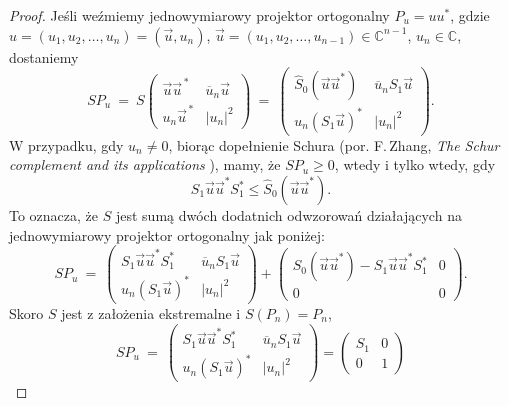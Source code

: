 \begin{proof}
Jeśli weźmiemy jednowymiarowy projektor ortogonalny
$P_{u} = u u^{*}$, gdzie
$u = (u_{1}, u_{2}, \ldots, u_{n}) = (\vec{u}, u_{n})$,
$\vec{u} = (u_{1}, u_{2}, \ldots, u_{n-1}) \in \mathbb{C}^{n-1}$,
$u_{n} \in \mathbb{C}$,
dostaniemy
\begin{equation}
 SP_{u} \:=\:  S \begin{pmatrix}
    \vec{u} \vec{u}^{\,*} & \overline{u}_{n} \vec{u} \\
    u_{n} \vec{u}^{\,*}   & |u_{n}|^{2}
 \end{pmatrix} \: = \:
 \begin{pmatrix}
    \hat{S}_{0}(\vec{u} \vec{u}^{*}) &
         \overline{u}_{n} S_{1} \vec{u} \\
    u_{n} ( S_{1} \vec{u} )^{*} &
        |u_{n}|^{2}
 \end{pmatrix}.
\end{equation}
W przypadku, gdy $u_{n} \neq 0$,
biorąc dopełnienie Schura
(por. F.\,Zhang, \emph{The Schur complement and its applications} \cite{Zhang2006}),
mamy, że $SP_{u} \geq 0$, wtedy i tylko wtedy, gdy
\begin{equation}
\label{ieq:SchurForS}
  S_{1} \vec{u} \vec{u}^{*} S_{1}^{*} \leq \hat{S}_{0}(\vec{u}\vec{u}^{*}).
\end{equation}
To oznacza, że $S$ jest sumą dwóch dodatnich odwzorowań działających na
jednowymiarowy projektor ortogonalny jak poniżej:
\begin{equation}
 SP_{u} \:=\:
 \begin{pmatrix}
      S_{1} \vec{u} \vec{u}^{*} S_{1}^{*}  &
         \overline{u}_{n} S_{1} \vec{u} \\
    u_{n} ( S_{1} \vec{u} )^{*} &
        |u_{n}|^{2}
 \end{pmatrix} +
 \begin{pmatrix}
    \hat{S}_{0}(\vec{u} \vec{u}^{*})  -  S_{1} \vec{u} \vec{u}^{*} S_{1}^{*} & 0 \\
    0 & 0
 \end{pmatrix}.
\end{equation}
Skoro $S$ jest z założenia ekstremalne i  $S(P_{n}) = P_{n}$,
\begin{equation}
 SP_{u} \:=\:
 \begin{pmatrix}
      S_{1} \vec{u} \vec{u}^{*} S_{1}^{*}  &
         \overline{u}_{n} S_{1} \vec{u} \\
    u_{n} ( S_{1} \vec{u} )^{*} &
        |u_{n}|^{2}
 \end{pmatrix} =
    \begin{pmatrix}
    S_{1} & 0 \\ 0 & 1

\end{pmatrix}
\end{equation}
\end{proof}
